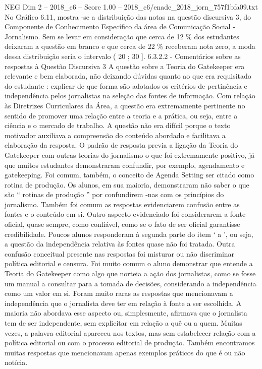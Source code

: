 \begin{textsample}{NEG Dim 2 – 2018\_c6 – Score 1.00 – 2018\_c6/enade\_2018\_jorn\_757f1bfa09.txt}
No Gráfico 6.11, mostra -se a distribuição das notas na questão discursiva 3, do Componente de Conhecimento Específico da área de Comunicação Social - Jornalismo.
Sem se levar em consideração que cerca de 12 \% dos estudantes deixaram a questão em branco e que cerca de 22 \% receberam nota zero, a moda dessa distribuição seria o intervalo ( 20 ; 30 ]. 6.3.2.2 - Comentários sobre as respostas à Questão Discursiva 3 A questão sobre a Teoria do Gatekeeper era relevante e bem elaborada, não deixando dúvidas quanto ao que era requisitado do estudante : explicar de que forma são adotados os critérios de pertinência e independência pelos jornalistas na seleção das fontes de informação.
Com relação às Diretrizes Curriculares da Área, a questão era extremamente pertinente no sentido de promover uma relação entre a teoria e a prática, ou seja, entre a ciência e o mercado de trabalho.
A questão não era difícil porque o texto motivador auxiliava a compreensão do conteúdo abordado e facilitava a elaboração da resposta.
O padrão de resposta previa a ligação da Teoria do Gatekeeper com outras teorias do jornalismo o que foi extremamente positivo, já que muitos estudantes demonstraram confundir, por exemplo, agendamento e gatekeeping.
Foi comum, também, o conceito de Agenda Setting ser citado como rotina de produção.
Os alunos, em sua maioria, demonstraram não saber o que são “ rotinas de produção ” por confundirem -nas com os princípios do jornalismo.
Também foi comum as respostas evidenciarem confusão entre as fontes e o conteúdo em si.
Outro aspecto evidenciado foi considerarem a fonte oficial, quase sempre, como confiável, como se o fato de ser oficial garantisse credibilidade.
Poucos alunos responderam à segunda parte do item ‘ a ’, ou seja, a questão da independência relativa às fontes quase não foi tratada.
Outra confusão conceitual presente nas respostas foi misturar ou não discriminar política editorial e censura.
Foi muito comum o aluno demonstrar que entende a Teoria do Gatekeeper como algo que norteia a ação dos jornalistas, como se fosse um manual a consultar para a tomada de decisões, considerando a independência como um valor em si.
Foram muito raras as respostas que mencionavam a independência que o jornalista deve ter em relação à fonte a ser escolhida.
A maioria não abordava esse aspecto ou, simplesmente, afirmava que o jornalista tem de ser independente, sem explicitar em relação a quê ou a quem.
Muitas vezes, a palavra editorial apareceu nos textos, mas sem estabelecer relação com a política editorial ou com o processo editorial de produção.
Também encontramos muitas respostas que mencionavam apenas exemplos práticos do que é ou não notícia.

\end{textsample}
